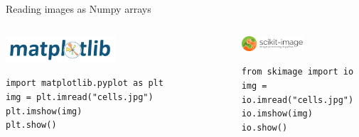 \documentclass[9pt, aspectratio=169]{beamer}
\begin{document}
\begin{frame}
    {Reading images as Numpy arrays}
    \begin{columns}
        \begin{column}{0.5\textwidth}
            \begin{center}
                \includegraphics[width=0.5\textwidth]{matplotlib_logo.png}
            \end{center}
            \begin{codebox}
                \texttt{import matplotlib.pyplot as plt\\
                    img = plt.imread("cells.jpg")\\
                    plt.imshow(img)\\
                    plt.show()
                }
            \end{codebox}
        \end{column}
        \begin{column}{0.5\textwidth}
            \begin{center}
                \includegraphics[width=0.5\textwidth]{skimage_logo.png}
            \end{center}
            \begin{codebox}
                \texttt{from skimage import io\\
                    img = io.imread("cells.jpg")\\
                    io.imshow(img)\\
                    io.show()
                }
            \end{codebox}
        \end{column}
    \end{columns}
\end{frame}
\end{document}
